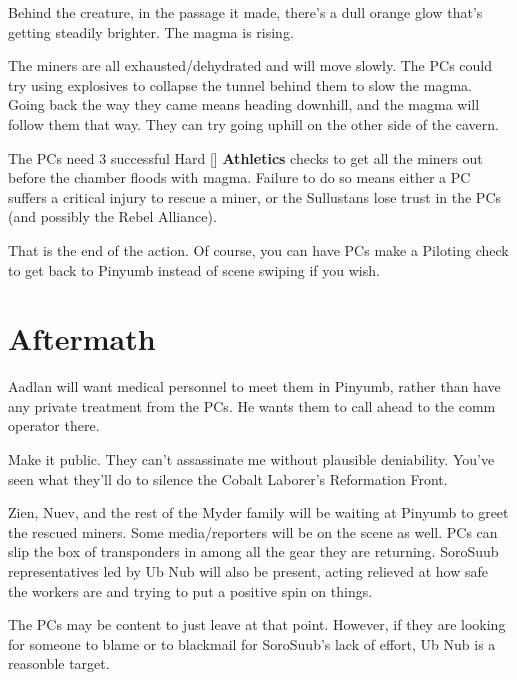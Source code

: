 \documentclass{book}
\newcommand{\df}{\difficulty}
\begin{document}
\begin{multicols*}{2}
Behind the creature, in the passage it made, there’s a dull orange glow that’s getting steadily brighter. The magma is rising.

The miners are all exhausted/dehydrated and will move slowly. The PCs could try using explosives to collapse the tunnel behind them to slow the magma. Going back the way they came means heading downhill, and the magma will follow them that way. They can try going uphill on the other side of the cavern.

The PCs need 3 successful Hard [\df\df\df] \textbf{Athletics} checks to get all the miners out before the chamber floods with magma.  Failure to do so means either a PC suffers a critical injury to rescue a miner, or the Sullustans lose trust in the PCs (and possibly the Rebel Alliance).

That is the end of the action. Of course, you can have PCs make a Piloting check to get back to Pinyumb instead of scene swiping if you wish.

\section{Aftermath}

Aadlan will want medical personnel to meet them in Pinyumb, rather than have any private treatment from the PCs. He wants them to call ahead to the comm operator there.\\
\begin{quoting}
Make it public. They can’t assassinate me without plausible deniability.  You’ve seen what they’ll do to silence the Cobalt Laborer’s Reformation Front.
\end{quoting}

Zien, Nuev, and the rest of the Myder family will be waiting at Pinyumb to greet the rescued miners. Some media/reporters will be on the scene as well. PCs can slip the box of transponders in among all the gear they are returning. SoroSuub representatives led by Ub Nub will also be present, acting relieved at how safe the workers are and trying to put a positive spin on things.

The PCs may be content to just leave at that point. However, if they are looking for someone to blame or to blackmail for SoroSuub's lack of effort, Ub Nub is a reasonble target.

\vfill\null
\columnbreak


\end{multicols*}
\end{document}
